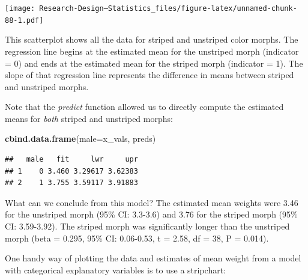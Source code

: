 \documentclass[
]{book}
\newenvironment{Shaded}{\begin{snugshade}}{\end{snugshade}}
\newcommand{\AttributeTok}[1]{\textcolor[rgb]{0.13,0.29,0.53}{#1}}
\newcommand{\FunctionTok}[1]{\textcolor[rgb]{0.13,0.29,0.53}{\textbf{#1}}}
\newcommand{\NormalTok}[1]{#1}
\begin{document}
\texttt{[image: Research-Design---Statistics\_files/figure-latex/unnamed-chunk-88-1.pdf]}

This scatterplot shows all the data for striped and unstriped color morphs. The regression line begins at the estimated mean for the unstriped morph (indicator = 0) and ends at the estimated mean for the striped morph (indicator = 1). The slope of that regression line represents the difference in means between striped and unstriped morphs.

Note that the \emph{predict} function allowed us to directly compute the estimated means for \emph{both} striped and unstriped morphs:

\begin{Shaded}
\begin{Highlighting}[]
\FunctionTok{cbind.data.frame}\NormalTok{(}\AttributeTok{male=}\NormalTok{x\_vals, preds)}
\end{Highlighting}
\end{Shaded}

\begin{verbatim}
##   male   fit     lwr     upr
## 1    0 3.460 3.29617 3.62383
## 2    1 3.755 3.59117 3.91883
\end{verbatim}

What can we conclude from this model? The estimated mean weights were 3.46 for the unstriped morph (95\% CI: 3.3-3.6) and 3.76 for the striped morph (95\% CI: 3.59-3.92). The striped morph was significantly longer than the unstriped morph (beta = 0.295, 95\% CI: 0.06-0.53, t = 2.58, df = 38, P = 0.014).

One handy way of plotting the data and estimates of mean weight from a model with categorical explanatory variables is to use a stripchart:
\end{document}
